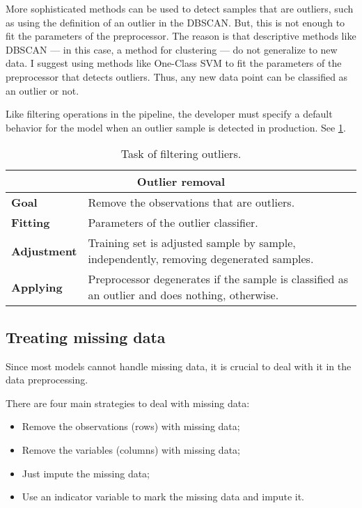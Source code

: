More sophisticated methods can be used to detect samples that are outliers, such as using
the definition of an outlier in the DBSCAN. But, this is not
enough to fit the parameters of the preprocessor.  The reason is that descriptive methods
like DBSCAN  --- in this case, a method for clustering --- do not generalize to new data.
I suggest using methods like One-Class SVM to fit the
parameters of the preprocessor that detects outliers.  Thus, any new data point can
be classified as an outlier or not.

Like filtering operations in the pipeline, the developer must specify a default behavior
for the model when an outlier sample is detected in production.  See
\cref{tab:outlier-removal}.

\begin{table}\caption{Task of filtering outliers.}
  \centering
  \begin{tabular}{lp{6cm}}
    \toprule
    \multicolumn{2}{c}{\textbf{Outlier removal}} \\
    \midrule
    \textbf{Goal} &
      Remove the observations that are outliers. \\
    \textbf{Fitting} &
      Parameters of the outlier classifier. \\
    \textbf{Adjustment} &
      Training set is adjusted sample by sample, independently, removing
      degenerated samples. \\
    \textbf{Applying} &
      Preprocessor degenerates if the sample is classified as an outlier and does
      nothing, otherwise. \\
    \bottomrule
  \end{tabular}
  \label{tab:outlier-removal}
\end{table}

\subsection{Treating missing data}

Since most models cannot handle missing data, it is crucial to deal with it in the data
preprocessing.

There are four main strategies to deal with missing data:
\begin{itemize}
  \itemsep0em
  \item Remove the observations (rows) with missing data;
  \item Remove the variables (columns) with missing data;
  \item Just impute the missing data;
  \item Use an indicator variable to mark the missing data and impute it.
\end{itemize}

